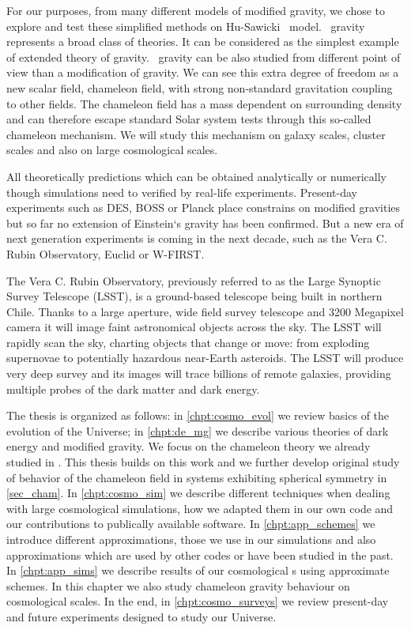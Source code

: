 For our purposes, from many different models of modified gravity, we chose to explore and test these simplified methods on Hu-Sawicki \fR\ model. \fR\ gravity represents a broad class of theories. It can be considered as the simplest example of extended theory of gravity. \fR\ gravity can be also studied from different point of view than a modification of gravity. We can see this extra degree of freedom as a new scalar field, chameleon field, with strong non-standard gravitation coupling to other fields. The chameleon field has a mass dependent on surrounding density and can therefore escape standard Solar system tests through this so-called chameleon mechanism. We will study this mechanism on galaxy scales, cluster scales and also on large cosmological scales.

All theoretically predictions which can be obtained analytically or numerically though simulations need to verified by real-life experiments. Present-day experiments such as DES, BOSS or Planck place constrains on modified gravities but so far no extension of Einstein`s gravity has been confirmed. But a new era of next generation experiments is coming in the next decade, such as the Vera C. Rubin Observatory, Euclid or W-FIRST.

The Vera C. Rubin Observatory, previously referred to as the Large Synoptic Survey Telescope (LSST), is a ground-based telescope being built in northern Chile. Thanks to a large aperture, wide field survey telescope and 3200 Megapixel camera it will image faint astronomical objects across the sky. The LSST will rapidly scan the sky, charting objects that change or move: from exploding supernovae to potentially hazardous near-Earth asteroids. The LSST will produce very deep survey and its images will trace billions of remote galaxies, providing multiple probes of the dark matter and dark energy.

The thesis is organized as follows: in \autoref{chpt:cosmo_evol} we review basics of the evolution of the Universe; in \autoref{chpt:de_mg}  we describe various theories of dark energy and modified gravity. We focus on the chameleon theory we already studied in \textcite{mastersthesis_vrastil}. This thesis builds on this work and we further develop original study of behavior of the chameleon field in systems exhibiting spherical symmetry in \autoref{sec_cham}. In \autoref{chpt:cosmo_sim} we describe different techniques when dealing with large cosmological simulations, how we adapted them in our own code and our contributions to publically available software. In \autoref{chpt:app_schemes} we introduce different approximations, those we use in our simulations and also approximations which are used by other codes or have been studied in the past. In \autoref{chpt:app_sims} we describe results of our cosmological \nbodysim s using approximate schemes. In this chapter we also study chameleon gravity behaviour on cosmological scales. In the end, in \autoref{chpt:cosmo_surveys} we review present-day and future experiments designed to study our Universe.


